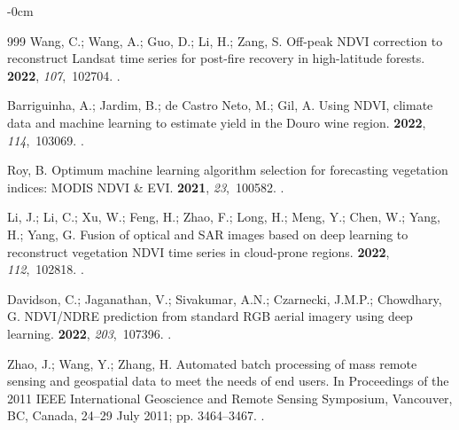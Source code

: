 \documentclass[jimaging,article,accept,pdftex,moreauthors]{Definitions/mdpi}
\begin{document}
\begin{adjustwidth}{-\extralength}{0cm}
\begin{thebibliography}{999}
Wang, C.; Wang, A.; Guo, D.; Li, H.; Zang, S.
\newblock Off-peak NDVI correction to reconstruct Landsat time series for
  post-fire recovery in high-latitude forests.
 {\bf 2022}, {\em 107},~102704.
.

Barriguinha, A.; Jardim, B.; {de Castro Neto}, M.; Gil, A.
\newblock Using NDVI, climate data and machine learning to estimate yield in
  the Douro wine region.
 {\bf 2022}, {\em 114},~103069.
.

Roy, B.
\newblock Optimum machine learning algorithm selection for forecasting
  vegetation indices: MODIS NDVI \& EVI.
 {\bf
  2021}, {\em 23},~100582.
.

\clearpage
{}
Li, J.; Li, C.; Xu, W.; Feng, H.; Zhao, F.; Long, H.; Meng, Y.; Chen, W.; Yang,
  H.; Yang, G.
\newblock Fusion of optical and SAR images based on deep learning to
  reconstruct vegetation NDVI time series in cloud-prone regions.
 {\bf 2022}, {\em 112},~102818.
.

Davidson, C.; Jaganathan, V.; Sivakumar, A.N.; Czarnecki, J.M.P.; Chowdhary, G.
\newblock NDVI/NDRE prediction from standard RGB aerial imagery using deep
  learning.
 {\bf 2022}, {\em
  203},~107396.
.

Zhao, J.; Wang, Y.; Zhang, H.
\newblock Automated batch processing of mass remote sensing and geospatial data
  to meet the needs of end users.
\newblock In Proceedings of the 2011 IEEE International Geoscience and Remote
  Sensing Symposium, Vancouver, BC, Canada, 24--29 July 2011; pp. 3464--3467.
.


\end{thebibliography}
\end{adjustwidth}
\end{document}
